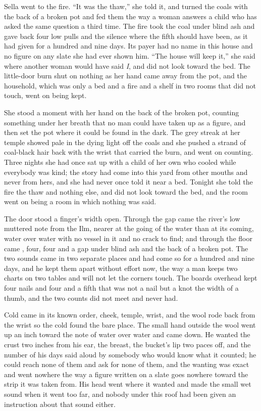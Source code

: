 \scenebreak

Sella went to the fire. “It was the thaw,” she told it, and turned the coals with the back of a broken pot and fed them the way a woman answers a child who has asked the same question a third time. The fire took the coal under blind ash and gave back four low pulls and the silence where the fifth should have been, as it had given for a hundred and nine days. Its payer had no name in this house and no figure on any slate she had ever shown him. “The house will keep it,” she said where another woman would have said \emph{I}, and did not look toward the bed. The little-door burn shut on nothing as her hand came away from the pot, and the household, which was only a bed and a fire and a shelf in two rooms that did not touch, went on being kept.

She stood a moment with her hand on the back of the broken pot, counting something under her breath that no man could have taken up as a figure, and then set the pot where it could be found in the dark. The grey streak at her temple showed pale in the dying light off the coals and she pushed a strand of coal-black hair back with the wrist that carried the burn, and went on counting. Three nights she had once sat up with a child of her own who cooled while everybody was kind; the story had come into this yard from other mouths and never from hers, and she had never once told it near a bed. Tonight she told the fire the thaw and nothing else, and did not look toward the bed, and the room went on being a room in which nothing was said.

The door stood a finger's width open. Through the gap came the river's low muttered note from the Ilm, nearer at the going of the water than at its coming, water over water with no vessel in it and no crack to find; and through the floor came , four, four and a gap under blind ash and the back of a broken pot. The two sounds came in two separate places and had come so for a hundred and nine days, and he kept them apart without effort now, the way a man keeps two charts on two tables and will not let the corners touch. The boards overhead kept four nails and four and a fifth that was not a nail but a knot the width of a thumb, and the two counts did not meet and never had.

Cold came in its known order, cheek, temple, wrist, and the wool rode back from the wrist so the cold found the bare place. The small hand outside the wool went up an inch toward the note of water over water and came down. He wanted the crust two inches from his ear, the breast, the bucket's lip two paces off, and the number of his days said aloud by somebody who would know what it counted; he could reach none of them and ask for none of them, and the wanting was exact and went nowhere the way a figure written on a slate goes nowhere toward the strip it was taken from. His head went where it wanted and made the small wet sound when it went too far, and nobody under this roof had been given an instruction about that sound either.

